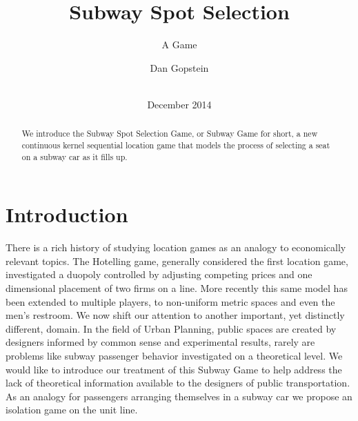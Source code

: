 \documentclass{acm_proc_article-sp}
\begin{document}
\title{Subway Spot Selection}
\subtitle{A Game}

\author{
\alignauthor
       Dan Gopstein\\
       \\
}

\date{December 2014}

\maketitle
\begin{abstract}
We introduce the Subway Spot Selection Game, or Subway Game for short, a new continuous kernel sequential location game that models the process of selecting a seat on a subway car as it fills up.
\end{abstract}

\section{Introduction}
There is a rich history of studying location games as an analogy to economically relevant topics. The Hotelling game\cite{hotelling1990stability}, generally considered the first location game, investigated a duopoly controlled by adjusting competing prices and one dimensional placement of two firms on a line. More recently this same model has been extended to multiple players\cite{economides1993hotelling}, to non-uniform metric spaces\cite{zhao2008isolation} and even the men's restroom\cite{heufer2011washroom, kranakis2010urinal}.
\indent We now shift our attention to another important, yet distinctly different, domain. In the field of Urban Planning, public spaces are created by designers informed by common sense and experimental results, rarely are problems like subway passenger behavior investigated on a theoretical level. We would like to introduce our treatment of this Subway Game to help address the lack of theoretical information available to the designers of public transportation. As an analogy for passengers arranging themselves in a subway car we propose an isolation game on the unit line.
\end{document}
